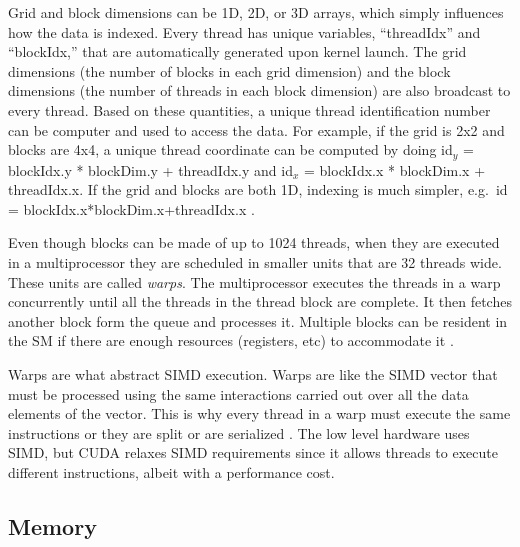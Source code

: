 Grid and block dimensions can be 1D, 2D, or 3D arrays, which simply influences how the data is indexed.  Every thread has unique variables, ``threadIdx'' and ``blockIdx,'' that are automatically generated upon kernel launch.  The grid dimensions (the number of blocks in each grid dimension) and the block dimensions (the number of threads in each block dimension) are also broadcast to every thread.  Based on these quantities, a unique thread identification number can be computer and used to access the data.   For example, if the grid is 2x2 and blocks are 4x4, a unique thread coordinate can be computed by doing id$_y$ = blockIdx.y * blockDim.y + threadIdx.y and id$_x$ = blockIdx.x * blockDim.x + threadIdx.x.  If the grid and blocks are both 1D, indexing is much simpler, e.g.\ id = blockIdx.x*blockDim.x+threadIdx.x \cite{cuda}.

Even though blocks can be made of up to 1024 threads, when they are executed in a multiprocessor they are scheduled in smaller units that are 32 threads wide.  These units are called \emph{warps}.  The multiprocessor executes the threads in a warp concurrently until all the threads in the thread block are complete.  It then fetches another block form the queue and processes it.  Multiple blocks can be resident in the SM if there are enough resources (registers, etc) to accommodate it \cite{cuda}.

Warps are what abstract SIMD execution.  Warps are like the SIMD vector that must be processed using the same interactions carried out over all the data elements of the vector.  This is why every thread in a warp must execute the same instructions or they are split or are serialized \cite{cuda}.  The low level hardware uses SIMD, but CUDA relaxes SIMD requirements since it allows threads to execute different instructions, albeit with a performance cost.
  

\subsection{Memory}

